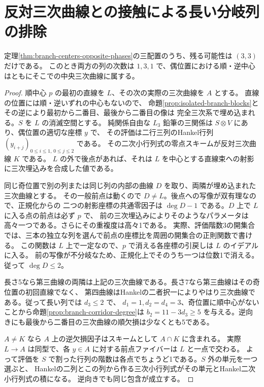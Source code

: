 \section{反対三次曲線との接触による長い分岐列の排除}
\label{sec:branch-cubic-contact}
\begin{theorem}\label{thm:branch-cubic-contact}
定理\ref{thm:branch-centers-opposite-phases}の三配置のうち、残る可能性は $(3,3)$ だけである。
このとき両方の列の次数は $1,3,1$ で、偶位置における順・逆中心はともにそこでの中央三次曲線に属する。
\end{theorem}
\begin{proof}
順中心 $p$ の最初の直線を $L$、その次の実際の三次曲線を $A$ とする。
直線の位置には順・逆いずれの中心もないので、
命題\ref{prop:isolated-branch-blocks}とその逆により最初から二番目、最後から二番目の像は
完全三次系で埋め込まれる。$S$ を $L$ の消滅空間とする。
純関係自由な $L_3$ 鉛筆の三関係は $S\otimes V$ にあり、偶位置の適切な座標 $y$ で、
その評価は二行三列のHankel行列 $(y_{i+j})_{0\le i\le1,\,0\le j\le2}$ である。
その二次小行列式の零点スキームが反対三次曲線 $K$ である。
$L$ の外で後点があれば、それは $L$ を中心とする直線束への射影に三次埋込みを合成した値である。

同じ奇位置で別の列または同じ列の内部の曲線 $D$ を取り、両隣が埋め込まれた三次曲線とする。
その一般前点は動くので $D\ne L$。後点への写像が双有理なので、正規化からの
二つの射影座標の共通零因子は $\deg D-1$ である。$D$ 上で $L$ に入る点の前点は必ず $p$ で、
前の三次埋込みによりそのようなパラメータは高々一つである。さらにその重複度は高々1である。
実際、評価階数3の開集合では、三本の独立な列を選んで前点の座標比を周囲の開集合の正則関数で書ける。
この関数は $L$ 上で一定なので、$p$ で消える各座標の引戻しは $L$ のイデアルに入る。
前の写像が不分岐なため、正規化上でそのうち一つは位数1で消える。従って $\deg D\le2$。

長さ5なら第三曲線の両隣は上記の三次曲線である。長さ7なら第三曲線はその奇位置の初回直線でなく、
第四曲線はHankelの二者択一によりやはり三次曲線である。従って長い列では $d_3\le2$ で、
$d_1=1,d_2=d_4=3$、奇位置に順中心がないことから命題\ref{prop:branch-corridor-degree}は
$b_2=11-3d_3\ge5$ を与える。逆向きにも最後から二番目の三次曲線の順欠損は少なくとも5である。

$A\ne K$ なら $A$ 上の逆欠損因子はスキームとして $A\cap K$ に含まれる。
実際 $L\to A$ は同型で、各 $y\in A$ に対する前点ファイバーは $L$ と一点で交わる。
よって評価を $S$ で割った行列の階数は各点でちょうど1である。$S$ 外の単元を一つ選ぶと、
Hankelの二列とこの列から作る三次小行列式がその単元とHankel二次小行列式の積になる。
逆向きでも同じ包含が成立する。


\end{proof}
